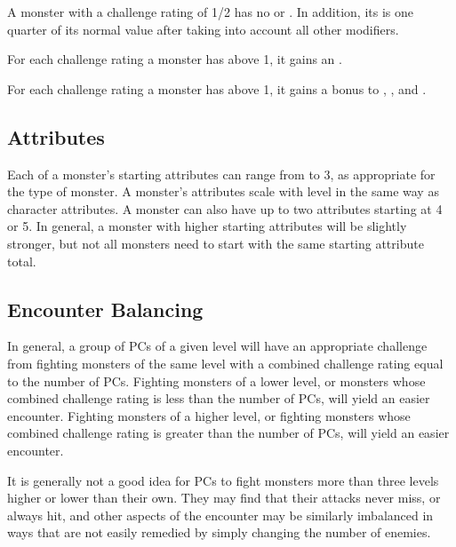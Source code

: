          A monster with a challenge rating of 1/2 has no  or .
        In addition, its  is one quarter of its normal value after taking into account all other modifiers.

         For each challenge rating a monster has above 1, it gains an .

         For each challenge rating a monster has above 1, it gains a  bonus to , , and .

    \subsection{Attributes}
        Each of a monster's starting attributes can range from  to 3, as appropriate for the type of monster.
        A monster's attributes scale with level in the same way as character attributes.
        A monster can also have up to two attributes starting at 4 or 5.
        In general, a monster with higher starting attributes will be slightly stronger, but not all monsters need to start with the same starting attribute total.

    \subsection{Encounter Balancing}\label{Encounter Balancing}
        In general, a group of PCs of a given level will have an appropriate challenge from fighting monsters of the same level with a combined challenge rating equal to the number of PCs.
        Fighting monsters of a lower level, or monsters whose combined challenge rating is less than the number of PCs, will yield an easier encounter.
        Fighting monsters of a higher level, or fighting monsters whose combined challenge rating is greater than the number of PCs, will yield an easier encounter.

        It is generally not a good idea for PCs to fight monsters more than three levels higher or lower than their own.
        They may find that their attacks never miss, or always hit, and other aspects of the encounter may be similarly imbalanced in ways that are not easily remedied by simply changing the number of enemies.


